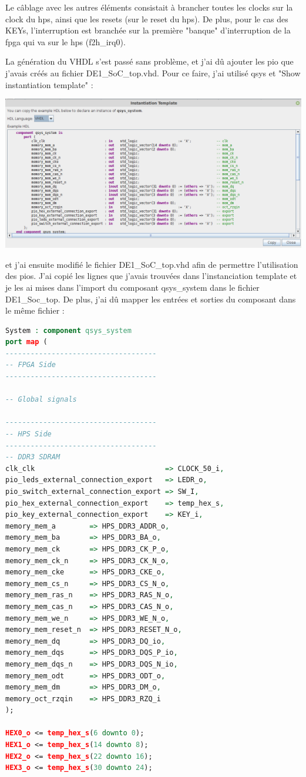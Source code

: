 Le câblage avec les autres éléments consistait à brancher toutes les clocks sur la clock du hps, ainsi que les resets (sur le reset du hps). De plus, pour le cas des KEYs, l'interruption est branchée sur la première "banque" d'interruption de la fpga qui va sur le hps (f2h\_irq0).

La génération du VHDL s'est passé sans problème, et j'ai dû ajouter les pio que j'avais créés au fichier DE1\_SoC\_top.vhd. Pour ce faire, j'ai utilisé qsys et "Show instantiation template" : 

\includegraphics[scale=0.4]{./images/show_instantiation_template.png}

et j'ai ensuite modifié le fichier DE1\_SoC\_top.vhd afin de permettre l'utilisation des pios. J'ai copié les lignes que j'avais trouvées dans l'instanciation template et je les ai mises dans l'import du composant qsys\_system dans le fichier DE1\_Soc\_top. De plus, j'ai dû mapper les entrées et sorties du composant dans le même fichier : 
\begin{lstlisting}[language=VHDL]
System : component qsys_system
port map (
------------------------------------
-- FPGA Side
------------------------------------

-- Global signals

------------------------------------
-- HPS Side
------------------------------------
-- DDR3 SDRAM
clk_clk                               => CLOCK_50_i,
pio_leds_external_connection_export   => LEDR_o,
pio_switch_external_connection_export => SW_I,
pio_hex_external_connection_export    => temp_hex_s,
pio_key_external_connection_export    => KEY_i,
memory_mem_a        => HPS_DDR3_ADDR_o,
memory_mem_ba       => HPS_DDR3_BA_o,
memory_mem_ck       => HPS_DDR3_CK_P_o,
memory_mem_ck_n     => HPS_DDR3_CK_N_o,
memory_mem_cke      => HPS_DDR3_CKE_o,
memory_mem_cs_n     => HPS_DDR3_CS_N_o,
memory_mem_ras_n    => HPS_DDR3_RAS_N_o,
memory_mem_cas_n    => HPS_DDR3_CAS_N_o,
memory_mem_we_n     => HPS_DDR3_WE_N_o,
memory_mem_reset_n  => HPS_DDR3_RESET_N_o,
memory_mem_dq       => HPS_DDR3_DQ_io,
memory_mem_dqs      => HPS_DDR3_DQS_P_io,
memory_mem_dqs_n    => HPS_DDR3_DQS_N_io,
memory_mem_odt      => HPS_DDR3_ODT_o,
memory_mem_dm       => HPS_DDR3_DM_o,
memory_oct_rzqin    => HPS_DDR3_RZQ_i
);

HEX0_o <= temp_hex_s(6 downto 0);
HEX1_o <= temp_hex_s(14 downto 8);
HEX2_o <= temp_hex_s(22 downto 16);
HEX3_o <= temp_hex_s(30 downto 24);

\end{lstlisting}

